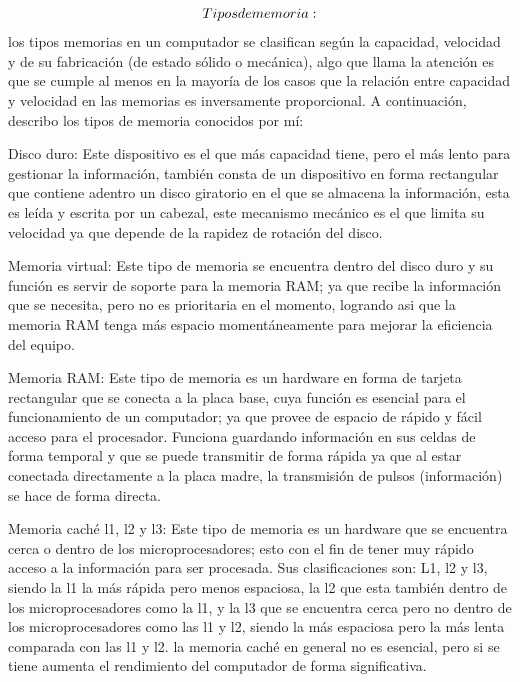 \documentclass{article}
\begin{document}
    \vspace{0,5cm}
        \begin{align}
        
        \LARGE
        Tipos de memoria:
        
        \end{align}
los tipos memorias en un computador se clasifican según la capacidad, velocidad y de su fabricación (de estado sólido o mecánica), algo que llama la atención es que se cumple al menos en la mayoría de los casos que la relación entre capacidad y velocidad en las memorias es inversamente proporcional. A continuación, describo los tipos de memoria conocidos por mí:

    \vspace{0.5cm}
Disco duro: Este dispositivo es el que más capacidad tiene, pero el más lento para gestionar la información, también consta de un dispositivo en forma rectangular que contiene adentro un disco giratorio en el que se almacena la información, esta es leída y escrita por un cabezal, este mecanismo mecánico es el que limita su velocidad ya que depende de la rapidez de rotación del disco.

    \vspace{0.5cm}
Memoria virtual: Este tipo de memoria se encuentra dentro del disco duro y su función es servir de soporte para la memoria RAM; ya que recibe la información que se necesita, pero no es prioritaria en el momento, logrando asi que la memoria RAM tenga más espacio momentáneamente para mejorar la eficiencia del equipo.

    \vspace{0.5cm}
Memoria RAM: Este tipo de memoria es un hardware en forma de tarjeta rectangular que se conecta a la placa base, cuya función es esencial para el funcionamiento de un computador; ya que provee de espacio de rápido y fácil acceso para el procesador. Funciona guardando información en sus celdas de forma temporal y que se puede transmitir de forma rápida ya que al estar conectada directamente a la placa madre, la transmisión de pulsos (información) se hace de forma directa.

    \vspace{0.5cm}
Memoria caché l1, l2 y l3: Este tipo de memoria es un hardware que se encuentra cerca o dentro de los microprocesadores\cite{Profesor}; esto con el fin de tener muy rápido acceso a la información para ser procesada. Sus clasificaciones son: L1, l2 y l3, siendo la l1 la más rápida pero menos espaciosa, la l2 que esta también dentro de los microprocesadores como la l1, y la l3 que se encuentra cerca pero no dentro de los microprocesadores como las l1 y l2, siendo la más espaciosa pero la más lenta comparada con las l1 y l2. la memoria caché en general no es esencial, pero si se tiene aumenta el rendimiento del computador de forma significativa.
\end{document}
